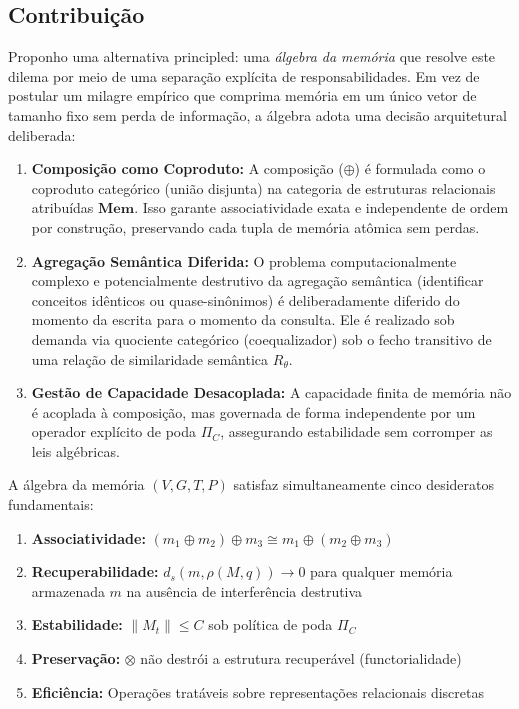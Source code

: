 \documentclass[11pt,a4paper]{article}
\theoremstyle{definition}
\begin{document}
\subsection{Contribui\c{c}\~ao}

Proponho uma alternativa principled: uma \emph{\'algebra da mem\'oria} que resolve este dilema por meio de uma separa\c{c}\~ao expl\'icita de responsabilidades. Em vez de postular um milagre emp\'irico que comprima mem\'oria em um \'unico vetor de tamanho fixo sem perda de informa\c{c}\~ao, a \'algebra adota uma decis\~ao arquitetural deliberada:
\begin{enumerate}
    \item \textbf{Composi\c{c}\~ao como Coproduto:} A composi\c{c}\~ao ($\oplus$) \'e formulada como o coproduto categ\'orico (uni\~ao disjunta) na categoria de estruturas relacionais atribu\'idas $\mathbf{Mem}$. Isso garante associatividade exata e independente de ordem por constru\c{c}\~ao, preservando cada tupla de mem\'oria at\^omica sem perdas.
    \item \textbf{Agrega\c{c}\~ao Sem\^antica Diferida:} O problema computacionalmente complexo e potencialmente destrutivo da agrega\c{c}\~ao sem\^antica (identificar conceitos id\^enticos ou quase-sin\^onimos) \'e deliberadamente diferido do momento da escrita para o momento da consulta. Ele \'e realizado sob demanda via quociente categ\'orico (coequalizador) sob o fecho transitivo de uma rela\c{c}\~ao de similaridade sem\^antica $R_\theta$.
    \item \textbf{Gest\~ao de Capacidade Desacoplada:} A capacidade finita de mem\'oria n\~ao \'e acoplada \`a composi\c{c}\~ao, mas governada de forma independente por um operador expl\'icito de poda $\Pi_C$, assegurando estabilidade sem corromper as leis alg\'ebricas.
\end{enumerate}

A \'algebra da mem\'oria $(V, G, T, P)$ satisfaz simultaneamente cinco desideratos fundamentais:

\begin{enumerate}[label=$\boxed{\text{\Alph*}}$]
    \item \textbf{Associatividade:} $(m_1 \oplus m_2) \oplus m_3 \cong m_1 \oplus (m_2 \oplus m_3)$
    \item \textbf{Recuperabilidade:} $d_s(m, \rho(M, q)) \to 0$ para qualquer mem\'oria armazenada $m$ na aus\^encia de interfer\^encia destrutiva
    \item \textbf{Estabilidade:} $\|M_t\| \le C$ sob pol\'itica de poda $\Pi_C$
    \item \textbf{Preserva\c{c}\~ao:} $\otimes$ n\~ao destr\'oi a estrutura recuper\'avel (functorialidade)
    \item \textbf{Efici\^encia:} Opera\c{c}\~oes trat\'aveis sobre representa\c{c}\~oes relacionais discretas
\end{enumerate}
\end{document}
